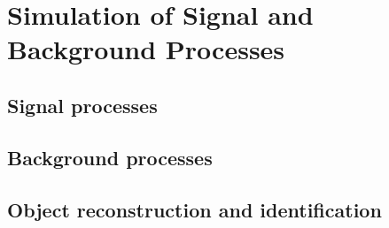 \section{Simulation of Signal and Background Processes}
\label{sec:samples}

\subsection{Signal processes}
\subsection{Background processes}
\subsection{Object reconstruction and identification}
